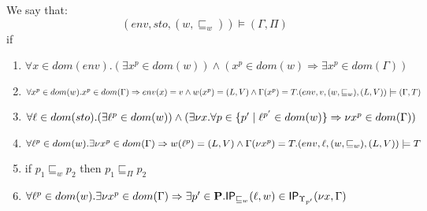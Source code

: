 \documentclass{llncs}
\newcommand{\sqleq}{\ensuremath{\sqsubseteq\xspace}}
\newcommand{\IP}{\ensuremath{\textsf{IP}}\xspace}
\begin{document}
\begin{definition}\label{def:EnvAgree}
	We say that:
	$$(env,sto,(w,\sqleq_w))\models(\Gamma,\Pi)$$
	if 
	\begin{enumerate}
		\item \label{prop:1} $\forall x\in dom(env).(\exists x^p\in dom(w))\wedge(x^p\in dom(w)\Rightarrow \exists x^p\in dom(\Gamma))$
		\item \label{prop:2} $\forall x^p\in dom(w).x^p\in dom(\Gamma)\Rightarrow env(x)=v\wedge w(x^p)=(L,V)\wedge\Gamma(x^p)=T.\\(env,v,(w,\sqleq_w),(L,V))\models (\Gamma,T)$
		\item \label{prop:3} $\forall \ell\in dom(sto).(\exists \ell^p\in dom(w))\wedge(\exists \nu x.\forall p\in\{p'\mid\ell^{p'}\in dom(w)\}\Rightarrow\nu x^p\in dom(\Gamma))$
		\item \label{prop:4} $\forall \loc^p \in dom(w).\exists\nu x^{p}\in dom(\Gamma)\Rightarrow w(\loc^p)=(L,V)\wedge\Gamma(\nu x^{p})=T.(env,\loc,(w,\sqleq_w),(L,V))\models T$
		\item \label{prop:5} if $p_1\sqleq_w p_2$ then $p_1\sqleq_\Pi p_2$
	\item \label{prop:6} $\forall \loc^p\in dom(w).\exists \nu
          x^p\in dom(\Gamma)\Rightarrow\exists
          p'\in\cat{P}.\IP_{\sqleq_w}(\loc,w)\in
          \IP_{\Upsilon_{p'}}(\nu x,\Gamma)$ 
	\end{enumerate}
\end{definition}



\end{document}
